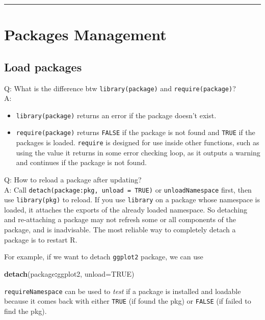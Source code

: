 \documentclass[
]{book}
\newenvironment{Shaded}{\begin{snugshade}}{\end{snugshade}}
\newcommand{\AttributeTok}[1]{\textcolor[rgb]{0.13,0.29,0.53}{#1}}
\newcommand{\ConstantTok}[1]{\textcolor[rgb]{0.56,0.35,0.01}{#1}}
\newcommand{\FunctionTok}[1]{\textcolor[rgb]{0.13,0.29,0.53}{\textbf{#1}}}
\newcommand{\NormalTok}[1]{#1}
\newcommand{\SpecialCharTok}[1]{\textcolor[rgb]{0.81,0.36,0.00}{\textbf{#1}}}
\theoremstyle{definition}
\theoremstyle{definition}
\theoremstyle{definition}
\theoremstyle{definition}
\theoremstyle{remark}
\begin{document}
\begin{center}\rule{0.5\linewidth}{0.5pt}\end{center}

\section{Packages Management}\label{packages-management}

\subsection{Load packages}\label{load-packages}

Q: What is the difference btw \texttt{library(package)} and \texttt{require(package)}?\\
A:

\begin{itemize}
\item
  \texttt{library(package)} returns an error if the package doesn't exist.
\item
  \texttt{require(package)} returns \texttt{FALSE} if the package is not found and \texttt{TRUE} if the packages is loaded. \texttt{require} is designed for use inside other functions, such as using the value it returns in some error checking loop, as it outputs a warning and continues if the package is not found.
\end{itemize}

Q: How to reload a package after updating?\\
A: Call \texttt{detach(package:pkg,\ unload\ =\ TRUE)} or \texttt{unloadNamespace} first, then use \texttt{library(pkg)} to reload. If you use \texttt{library} on a package whose namespace is loaded, it attaches the exports of the already loaded namespace. So detaching and re-attaching a package may not refresh some or all components of the package, and is inadvisable. The most reliable way to completely detach a package is to {restart R}.

For example, if we want to detach \texttt{ggplot2} package, we can use

\begin{Shaded}
\begin{Highlighting}[]
\FunctionTok{detach}\NormalTok{(package}\SpecialCharTok{:}\NormalTok{ggplot2, }\AttributeTok{unload=}\ConstantTok{TRUE}\NormalTok{)}
\end{Highlighting}
\end{Shaded}

\texttt{requireNamespace} can be used to \emph{test} if a package is installed and loadable because it comes back with either \texttt{TRUE} (if found the pkg) or \texttt{FALSE} (if failed to find the pkg).
\end{document}
